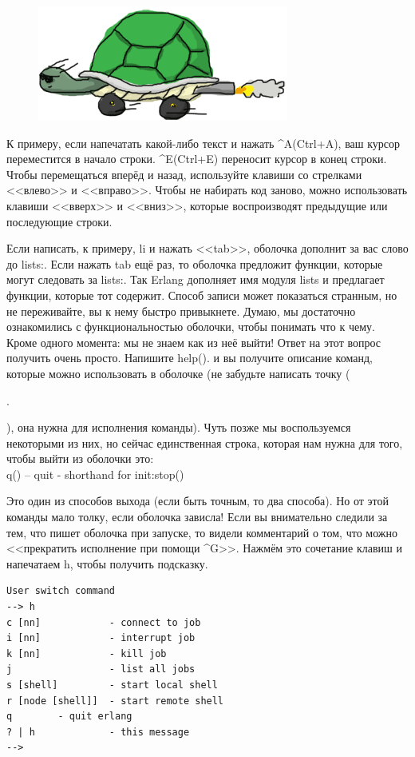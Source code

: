 \documentclass[a4paper,12pt]{report}
\newcommand{\ops}{\colorbox{lgreen}}
\begin{document}
\begin{figure}
    \includegraphics[width=1\linewidth]{shell.png}
\end{figure}
К примеру, если напечатать какой\--либо текст и нажать \ops{\textasciicircum A}(Ctrl+A), ваш курсор переместится в начало строки. \ops{\textasciicircum E}(Ctrl+E) переносит курсор в конец строки. Чтобы перемещаться вперёд и назад, используйте клавиши со стрелками <<влево>> и <<вправо>>. Чтобы не набирать код заново, можно использовать клавиши <<вверх>> и <<вниз>>, которые воспроизводят предыдущие или последующие строки.

Если написать, к примеру, \ops{li} и нажать <<tab>>, оболочка дополнит за вас слово до \ops{lists:}. Если нажать tab ещё раз, то оболочка предложит функции, которые могут следовать за lists:. Так Erlang дополняет имя модуля lists и предлагает функции, которые тот содержит. Способ записи может показаться странным, но не переживайте, вы к нему быстро привыкнете.
Думаю, мы достаточно ознакомились с функциональностью оболочки, чтобы понимать что к чему. Кроме одного момента: мы не знаем как из неё выйти! Ответ на этот вопрос получить очень просто. Напишите \ops{help().} и вы получите описание команд, которые можно использовать в оболочке (не забудьте написать точку (\ops{\strut.}), она нужна для исполнения команды). Чуть позже мы воспользуемся некоторыми из них, но сейчас единственная строка, которая нам нужна для того, чтобы выйти из оболочки это:\\ 
\ops{q() -- quit - shorthand for init:stop()} 

Это один из способов выхода (если быть точным, то два способа). Но от этой команды мало толку, если оболочка зависла! Если вы внимательно следили за тем, что пишет оболочка при запуске, то видели комментарий о том, что можно <<прекратить исполнение при помощи \ops{\textasciicircum G}>>. Нажмём это сочетание клавиш и напечатаем h, чтобы получить подсказку.
\begin{lstlisting}[style=repl]
User switch command
--> h
c [nn]            - connect to job
i [nn]            - interrupt job
k [nn]            - kill job
j                 - list all jobs
s [shell]         - start local shell
r [node [shell]]  - start remote shell
q        - quit erlang
? | h             - this message
-->
\end{lstlisting}
\end{document}

